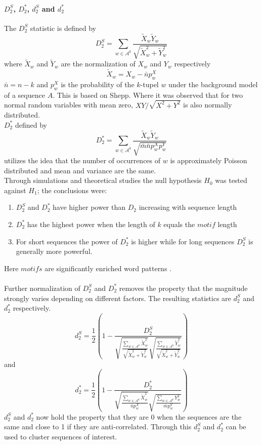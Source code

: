 \documentclass[twocolumn]{bmcart}%
\begin{document}
\paragraph*{$D_2^S$, $D_2^*$, $d_2^S$ and $d_2^*$}
The $D_2^S$ statistic is defined by
$$D_2^S=\sum_{w\in \mathcal{A}^k}\frac{\widetilde{X}_w\widetilde{Y}_w}{\sqrt{\widetilde{X}_w^2+\widetilde{Y}_w^2}}$$
where $\widetilde{X}_w$ and $\widetilde{Y}_w$ are the normalization of $X_w$ and $Y_w$ respectively
$$\widetilde{X}_w=X_w-\bar{n}p_w^X$$
$\bar{n}=n-k$ and $p_w^X$ is the probability of the  $k$-tupel $w$ under the background model of a sequence $A$.
This is based on Shepp\cite{shepp1962normal}. Where it was observed that for two normal random variables with mean zero, $XY/\sqrt{X^2+Y^2}$ is also normally distributed.\\
$D_2^*$ defined by
$$D_2^*=\sum_{w\in \mathcal{A}^k}\frac{\widetilde{X}_w\widetilde{Y}_w}{\sqrt{\bar{m}\bar{n}p_w^Xp_w^Y}}$$
utilizes the idea that the number of occurrences of $w$ is approximately Poisson distributed and mean and variance are the same.\\
Through simulations and theoretical studies the null hypothesis $H_0$ was tested against $H_1$; the conclusions were:
\begin{enumerate}
\item 	$D_2^S$ and $D_2^*$ have higher power than $D_2$ increasing with sequence length
\item $D_2^*$ has the highest power when the length of $k$ equals the $motif$ length
\item For short sequences the power of $D_2^*$ is higher while for long sequences $D_2^S$ is generally more powerful.
\end{enumerate}
Here $motifs$ are significantly enriched word patterns \cite{doi:10.1093/bib/bbt067}.\\
\\
Further normalization of $D_2^S$ and $D_2^*$ removes the property that the magnitude strongly varies depending on different factors. The resulting statistics are $d_2^S$ and $d_2^*$ respectively.
$$d_2^S=\frac{1}{2}\left(1-\frac{D_2^S}{\sqrt{\frac{\sum_{w\in \mathcal{A}^k}\widetilde{X}_w^2}{\sqrt{\widetilde{X}_w^2+\widetilde{Y}_w^2}}}\sqrt{\frac{\sum_{w\in \mathcal{A}^k}\widetilde{Y}_w^2}{\sqrt{\widetilde{X}_w^2+\widetilde{Y}_w^2}}}}\right)$$
and
$$d_2^*=\frac{1}{2}\left(1-\frac{D_2^*}{\sqrt{\frac{\sum_{w\in \mathcal{A}^k}\widetilde{X}_w^2}{\bar{n}p_w^X}}\sqrt{\frac{\sum_{w\in \mathcal{A}^k}Y_w^2}{\bar{m}p_w^Y}}}\right)$$
$d_2^S$ and $d_2^*$ now hold the property that they are 0 when the sequences are the same and close to 1 if they are anti-correlated.
Through this $d_2^S$ and $d_2^*$ can be used to cluster sequences of interest. 
\end{document}
